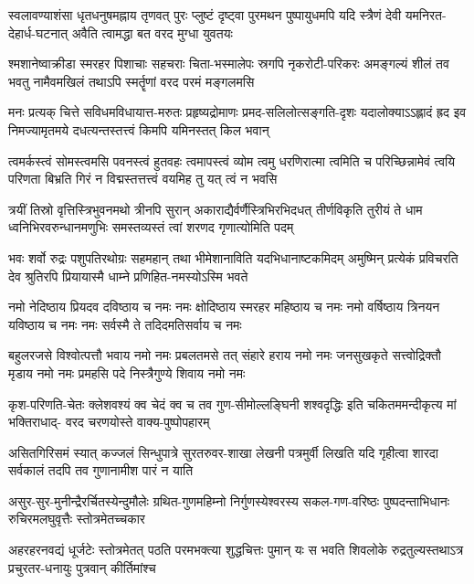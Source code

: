 \fourlineindentedshloka
{स्वलावण्याशंसा धृतधनुषमह्नाय तृणवत्}
{पुरः प्लुष्टं दृष्ट्वा पुरमथन पुष्पायुधमपि}
{यदि स्त्रैणं देवी यमनिरत-देहार्ध-घटनात्}
{अवैति त्वामद्धा बत वरद मुग्धा युवतयः}%

\fourlineindentedshloka
{श्मशानेष्वाक्रीडा स्मरहर पिशाचाः सहचराः}
{चिता-भस्मालेपः स्रगपि नृकरोटी-परिकरः}
{अमङ्गल्यं शीलं तव भवतु नामैवमखिलं}
{तथाऽपि स्मर्तॄणां वरद परमं मङ्गलमसि}%

\fourlineindentedshloka
{मनः प्रत्यक् चित्ते सविधमविधायात्त-मरुतः}
{प्रहृष्यद्रोमाणः प्रमद-सलिलोत्सङ्गति-दृशः}
{यदालोक्याऽऽह्लादं ह्रद इव निमज्यामृतमये}
{दधत्यन्तस्तत्त्वं किमपि यमिनस्तत् किल भवान्}%

\fourlineindentedshloka
{त्वमर्कस्त्वं सोमस्त्वमसि पवनस्त्वं हुतवहः}
{त्वमापस्त्वं व्योम त्वमु धरणिरात्मा त्वमिति च}
{परिच्छिन्नामेवं त्वयि परिणता बिभ्रति गिरं}
{न विद्मस्तत्तत्त्वं वयमिह तु यत् त्वं न भवसि}%

\fourlineindentedshloka
{त्रयीं तिस्रो वृत्तिस्त्रिभुवनमथो त्रीनपि सुरान्}
{अकाराद्यैर्वर्णैस्त्रिभिरभिदधत् तीर्णविकृति}
{तुरीयं ते धाम ध्वनिभिरवरुन्धानमणुभिः}
{समस्तव्यस्तं त्वां शरणद गृणात्योमिति पदम्}%

\fourlineindentedshloka
{भवः शर्वो रुद्रः पशुपतिरथोग्रः सहमहान्}
{तथा भीमेशानाविति यदभिधानाष्टकमिदम्}
{अमुष्मिन् प्रत्येकं प्रविचरति देव श्रुतिरपि}
{प्रियायास्मै धाम्ने प्रणिहित-नमस्योऽस्मि भवते}%

\fourlineindentedshloka
{नमो नेदिष्ठाय प्रियदव दविष्ठाय च नमः}
{नमः क्षोदिष्ठाय स्मरहर महिष्ठाय च नमः}
{नमो वर्षिष्ठाय त्रिनयन यविष्ठाय च नमः}
{नमः सर्वस्मै ते तदिदमतिसर्वाय च नमः}%

\fourlineindentedshloka
{बहुलरजसे विश्वोत्पत्तौ भवाय नमो नमः}
{प्रबलतमसे तत् संहारे हराय नमो नमः}
{जनसुखकृते सत्त्वोद्रिक्तौ मृडाय नमो नमः}
{प्रमहसि पदे निस्त्रैगुण्ये शिवाय नमो नमः}%

\fourlineindentedshloka
{कृश-परिणति-चेतः क्लेशवश्यं क्व चेदं}
{क्व च तव गुण-सीमोल्लङ्घिनी शश्वदृद्धिः}
{इति चकितममन्दीकृत्य मां भक्तिराधाद्-}
{वरद चरणयोस्ते वाक्य-पुष्पोपहारम्}%

\fourlineindentedshloka
{असितगिरिसमं स्यात् कज्जलं सिन्धुपात्रे}
{सुरतरुवर-शाखा लेखनी पत्रमुर्वी}
{लिखति यदि गृहीत्वा शारदा सर्वकालं}
{तदपि तव गुणानामीश पारं न याति}%

\fourlineindentedshloka
{असुर-सुर-मुनीन्द्रैरर्चितस्येन्दुमौलेः}
{ग्रथित-गुणमहिम्नो निर्गुणस्येश्वरस्य}
{सकल-गण-वरिष्ठः पुष्पदन्ताभिधानः}
{रुचिरमलघुवृत्तैः स्तोत्रमेतच्चकार}%

\fourlineindentedshloka
{अहरहरनवद्यं धूर्जटेः स्तोत्रमेतत्}
{पठति परमभक्त्या शुद्धचित्तः पुमान् यः}
{स भवति शिवलोके रुद्रतुल्यस्तथाऽत्र}
{प्रचुरतर-धनायुः पुत्रवान् कीर्तिमांश्च}%

